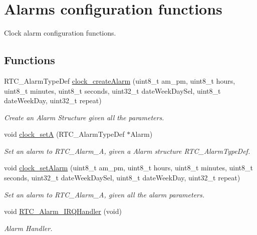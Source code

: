 \hypertarget{group___clock___alarms}{}\section{Alarms configuration functions}
\label{group___clock___alarms}


Clock alarm configuration functions.  


\subsection*{Functions}
\begin{DoxyCompactItemize}
\item 
R\+T\+C\+\_\+\+Alarm\+Type\+Def \hyperlink{group___clock___alarms_ga5e1614dbb1a210106dbade3f133db27e}{clock\+\_\+create\+Alarm} (uint8\+\_\+t am\+\_\+pm, uint8\+\_\+t hours, uint8\+\_\+t minutes, uint8\+\_\+t seconds, uint32\+\_\+t date\+Week\+Day\+Sel, uint8\+\_\+t date\+Week\+Day, uint32\+\_\+t repeat)
\begin{DoxyCompactList}\small\item\em Create an Alarm Structure given all the parameters. \end{DoxyCompactList}\item 
void \hyperlink{group___clock___alarms_gab56f512746d4f2638232db28bb7dac2b}{clock\+\_\+setA} (R\+T\+C\+\_\+\+Alarm\+Type\+Def $\ast$Alarm)
\begin{DoxyCompactList}\small\item\em Set an alarm to R\+T\+C\+\_\+\+Alarm\+\_\+A, given a Alarm structure R\+T\+C\+\_\+\+Alarm\+Type\+Def. \end{DoxyCompactList}\item 
void \hyperlink{group___clock___alarms_gaea1a099c4ad6de8b99517ac6453e3569}{clock\+\_\+set\+Alarm} (uint8\+\_\+t am\+\_\+pm, uint8\+\_\+t hours, uint8\+\_\+t minutes, uint8\+\_\+t seconds, uint32\+\_\+t date\+Week\+Day\+Sel, uint8\+\_\+t date\+Week\+Day, uint32\+\_\+t repeat)
\begin{DoxyCompactList}\small\item\em Set an alarm to R\+T\+C\+\_\+\+Alarm\+\_\+A, given all the alarm parameters. \end{DoxyCompactList}\item 
void \hyperlink{group___clock___alarms_ga4da4fb52ec579671d337938e78f9a207}{R\+T\+C\+\_\+\+Alarm\+\_\+\+I\+R\+Q\+Handler} (void)
\begin{DoxyCompactList}\small\item\em Alarm Handler. \end{DoxyCompactList}\end{DoxyCompactItemize}


